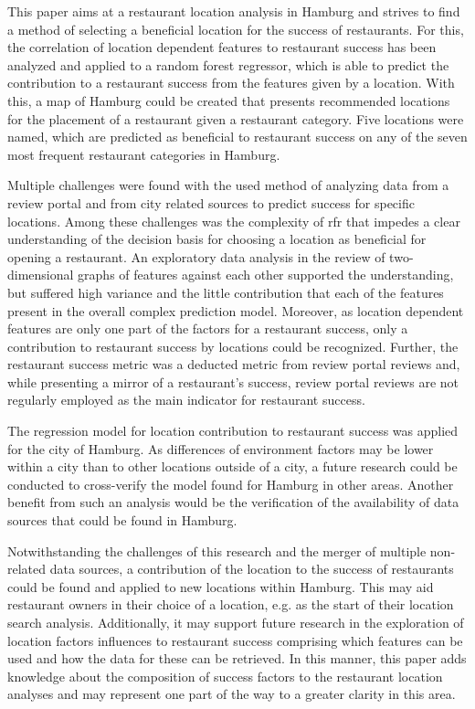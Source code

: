 \documentclass[a4paper, 11pt, oneside]{Thesis}  %
\begin{document}
This paper aims at a restaurant location analysis in Hamburg and strives to find a method of selecting a beneficial location for the success of restaurants. For this, the correlation of location dependent features to restaurant success has been analyzed and applied to a random forest regressor, which is able to predict the contribution to a restaurant success from the features given by a location. With this, a map of Hamburg could be created that presents recommended locations for the placement of a restaurant given a restaurant category. Five locations were named, which are predicted as beneficial to restaurant success on any of the seven most frequent restaurant categories in Hamburg.

Multiple challenges were found with the used method of analyzing data from a review portal and from city related sources to predict success for specific locations. Among these challenges was the complexity of \ac{rfr} that impedes a clear understanding of the decision basis for choosing a location as beneficial for opening a restaurant. An exploratory data analysis in the review of two-dimensional graphs of features against each other supported the understanding, but suffered high variance and the little contribution that each of the features present in the overall complex prediction model. Moreover, as location dependent features are only one part of the factors for a restaurant success, only a contribution to restaurant success by locations could be recognized. Further, the restaurant success metric was a deducted metric from review portal reviews and, while presenting a mirror of a restaurant's success, review portal reviews are not regularly employed as the main indicator for restaurant success.

The regression model for location contribution to restaurant success was applied for the city of Hamburg. As differences of environment factors may be lower within a city than to other locations outside of a city, a future research could be conducted to cross-verify the model found for Hamburg in other areas. Another benefit from such an analysis would be the verification of the availability of data sources that could be found in Hamburg.

Notwithstanding the challenges of this research and the merger of multiple non-related data sources, a contribution of the location to the success of restaurants could be found and applied to new locations within Hamburg. This may aid restaurant owners in their choice of a location, e.g. as the start of their location search analysis. Additionally, it may support future research in the exploration of location factors influences to restaurant success comprising which features can be used and how the data for these can be retrieved. In this manner, this paper adds knowledge about the composition of success factors to the restaurant location analyses and may represent one part of the way to a greater clarity in this area.
\end{document}
